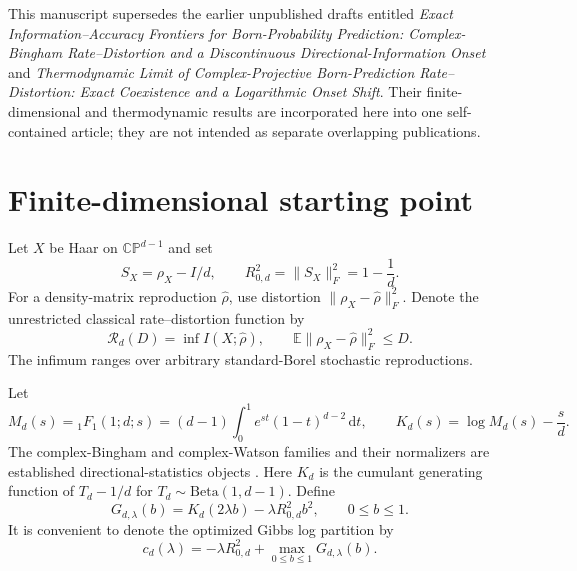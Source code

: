 \documentclass[11pt,a4paper]{article}
\theoremstyle{remark}
\newcommand{\CP}{\mathbb{CP}}
\newcommand{\E}{\mathbb{E}}
\newcommand{\cR}{\mathcal{R}}
\newcommand{\dd}{\,\mathrm{d}}
\begin{document}
This manuscript supersedes the earlier unpublished drafts entitled
\emph{Exact Information--Accuracy Frontiers for Born-Probability Prediction:
Complex-Bingham Rate--Distortion and a Discontinuous Directional-Information
Onset} and \emph{Thermodynamic Limit of Complex-Projective Born-Prediction
Rate--Distortion: Exact Coexistence and a Logarithmic Onset Shift}.  Their
finite-dimensional and thermodynamic results are incorporated here into one
self-contained article; they are not intended as separate overlapping
publications.

\section{Finite-dimensional starting point}

Let $X$ be Haar on $\CP^{d-1}$ and set
\begin{equation}
 S_X=\rho_X-I/d,
 \qquad R_{0,d}^2=\|S_X\|_F^2=1-\frac1d.
 \label{eq:centered-projector}
\end{equation}
For a density-matrix reproduction $\widehat\rho$, use distortion
$\|\rho_X-\widehat\rho\|_F^2$.  Denote the unrestricted classical
rate--distortion function by
\begin{equation}
 \cR_d(D)=\inf I(X;\widehat\rho),
 \qquad \E\|\rho_X-\widehat\rho\|_F^2\le D.
 \label{eq:rdf-definition}
\end{equation}
The infimum ranges over arbitrary standard-Borel stochastic reproductions.

Let
\begin{equation}
 M_d(s)={}_1F_1(1;d;s)
       =(d-1)\int_0^1e^{st}(1-t)^{d-2}\dd t,
 \qquad
 K_d(s)=\log M_d(s)-\frac{s}{d}.
 \label{eq:MdKd}
\end{equation}
The complex-Bingham and complex-Watson families and their normalizers are
established directional-statistics objects
\cite{Kent1994ComplexBingham,MardiaDryden1999}.  Here $K_d$ is the cumulant generating function of
$T_d-1/d$ for $T_d\sim\mathrm{Beta}(1,d-1)$.  Define
\begin{equation}
 G_{d,\lambda}(b)=K_d(2\lambda b)
                  -\lambda R_{0,d}^2b^2,
 \qquad 0\le b\le1.
 \label{eq:finite-free-energy}
\end{equation}
It is convenient to denote the optimized Gibbs log partition by
\begin{equation}
 c_d(\lambda)=-\lambda R_{0,d}^2+\max_{0\le b\le1}G_{d,\lambda}(b).
 \label{eq:cd-definition}
\end{equation}
\end{document}
